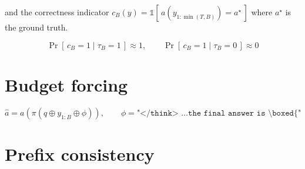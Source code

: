 \documentclass[12pt,a4paper,oneside]{report}
\newif\ifdraft
\newcommand{\writehere}[2]{%
  \ifdraft
    \begin{tcolorbox}[colback=yellow!8,colframe=orange!55,
                      boxrule=0.6pt,left=6pt,right=6pt,top=4pt,bottom=4pt]
    {\small\textbf{WRITE: #1}\\[2pt]#2}
    \end{tcolorbox}
  \fi}
\begin{document}
and the correctness indicator
$c_B(y) = \mathbb{1}[\,a(y_{1:\min(T,B)}) = a^{\star}\,]$
where $a^{\star}$ is the ground truth.

\writehere{1 paragraph on what the two hypotheses predict}{
Under the capability hypothesis, truncated traces are wrong because the reasoning
is incomplete, so correctness should fall smoothly across both groups. Under the
termination hypothesis, correctness should be near total among terminated samples
and near zero among truncated ones. Point at Equation \eqref{eq:hypotheses} and
say this is what makes the two distinguishable by measurement.}

\begin{equation}
\Pr[\,c_B = 1 \mid \tau_B = 1\,] \approx 1,
\qquad
\Pr[\,c_B = 1 \mid \tau_B = 0\,] \approx 0
\label{eq:hypotheses}
\end{equation}

\section{Budget forcing}

\writehere{1 paragraph}{
Describe the procedure in words before the equation. Forcing acts only on
truncated samples: take the truncated prefix, append a fixed phrase that closes the
reasoning block and asks for the answer, decode greedily for a short continuation.
Samples that terminated on their own are left untouched, and say explicitly that
this is why the method cannot damage them. Note the cost, about five generated
tokens per intervened sample.}

\begin{equation}
\hat{a} = a\!\left(\pi\!\left(q \oplus y_{1:B} \oplus \phi\right)\right),
\qquad
\phi = \texttt{"</think> \ldots the final answer is \textbackslash boxed\{"}
\label{eq:forcing}
\end{equation}

\writehere{2 sentences on the three variants}{
Name them: a bare demand ($V_1$), a soft deadline ($V_3$), and a two stage variant
($V_2$) where the model first summarises what it established and only then is
asked for the answer. Say why you tested three rather than one.}

\section{Prefix consistency}

\writehere{1 paragraph}{
Explain Equation \eqref{eq:prefix} in plain words: the model generates left to
right and has no knowledge of its own budget, so the distribution of the first N
tokens does not depend on where generation was stopped. Then the consequence:
saving traces at the top budget lets every smaller budget be scored on CPU at zero
GPU cost. Say you validated this in Chapter 4 rather than assuming it.}
\end{document}
